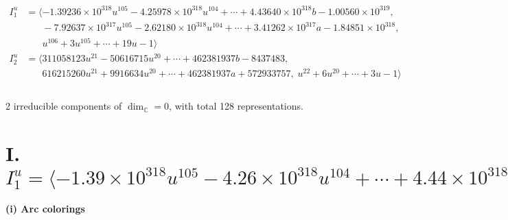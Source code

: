 \documentclass[1p]{elsarticle_modified}
\theoremstyle{definition}
\begin{document}
\begin{align*}
I^u_{1}&=\langle 
-1.39236\times10^{318} u^{105}-4.25978\times10^{318} u^{104}+\cdots+4.43640\times10^{318} b-1.00560\times10^{319},\\
\phantom{I^u_{1}}&\phantom{= \langle  }-7.92637\times10^{317} u^{105}-2.62180\times10^{318} u^{104}+\cdots+3.41262\times10^{317} a-1.84851\times10^{318},\\
\phantom{I^u_{1}}&\phantom{= \langle  }u^{106}+3 u^{105}+\cdots+19 u-1\rangle \\
I^u_{2}&=\langle 
311058123 u^{21}-50616715 u^{20}+\cdots+462381937 b-8437483,\\
\phantom{I^u_{2}}&\phantom{= \langle  }616215260 u^{21}+9916634 u^{20}+\cdots+462381937 a+572933757,\;u^{22}+6 u^{20}+\cdots+3 u-1\rangle \\
\\
\end{align*}
\raggedright * 2 irreducible components of $\dim_{\mathbb{C}}=0$, with total 128 representations.\\
\newpage
\renewcommand{\arraystretch}{1}
\centering \section*{I. $I^u_{1}= \langle -1.39\times10^{318} u^{105}-4.26\times10^{318} u^{104}+\cdots+4.44\times10^{318} b-1.01\times10^{319},\;-7.93\times10^{317} u^{105}-2.62\times10^{318} u^{104}+\cdots+3.41\times10^{317} a-1.85\times10^{318},\;u^{106}+3 u^{105}+\cdots+19 u-1 \rangle$}
\flushleft \textbf{(i) Arc colorings}\\
\end{document}
